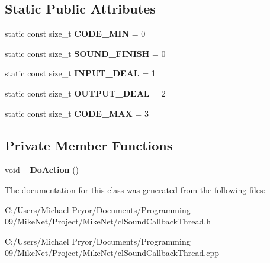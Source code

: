 \subsection*{Static Public Attributes}
\begin{DoxyCompactItemize}
\item 
\hypertarget{classcl_sound_thread_a5818f6a90d5e4bb6e4000e001a2339d1}{
static const size\_\-t {\bfseries CODE\_\-MIN} = 0}
\label{classcl_sound_thread_a5818f6a90d5e4bb6e4000e001a2339d1}

\item 
\hypertarget{classcl_sound_thread_afdbd7ed2943e6ed5a7e3d922e23606f5}{
static const size\_\-t {\bfseries SOUND\_\-FINISH} = 0}
\label{classcl_sound_thread_afdbd7ed2943e6ed5a7e3d922e23606f5}

\item 
\hypertarget{classcl_sound_thread_a0710a2574660dbba197c76988794985b}{
static const size\_\-t {\bfseries INPUT\_\-DEAL} = 1}
\label{classcl_sound_thread_a0710a2574660dbba197c76988794985b}

\item 
\hypertarget{classcl_sound_thread_a4b21a938c375e60226e3e6e4bfc79e0c}{
static const size\_\-t {\bfseries OUTPUT\_\-DEAL} = 2}
\label{classcl_sound_thread_a4b21a938c375e60226e3e6e4bfc79e0c}

\item 
\hypertarget{classcl_sound_thread_a3119f590f570d7b1cdb6f8bd790bc639}{
static const size\_\-t {\bfseries CODE\_\-MAX} = 3}
\label{classcl_sound_thread_a3119f590f570d7b1cdb6f8bd790bc639}

\end{DoxyCompactItemize}
\subsection*{Private Member Functions}
\begin{DoxyCompactItemize}
\item 
\hypertarget{classcl_sound_thread_a7b577d1ec8ed39fd68721e4ce9ef6c87}{
void {\bfseries \_\-DoAction} ()}
\label{classcl_sound_thread_a7b577d1ec8ed39fd68721e4ce9ef6c87}

\end{DoxyCompactItemize}


The documentation for this class was generated from the following files:\begin{DoxyCompactItemize}
\item 
C:/Users/Michael Pryor/Documents/Programming 09/MikeNet/Project/MikeNet/clSoundCallbackThread.h\item 
C:/Users/Michael Pryor/Documents/Programming 09/MikeNet/Project/MikeNet/clSoundCallbackThread.cpp\end{DoxyCompactItemize}
